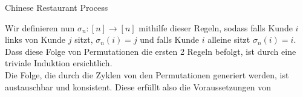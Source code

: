 \begin{section}{Chinese Restaurant Process}
\begin{enumerate}
\end{enumerate}
Wir definieren nun $\sigma_n: [n] \rightarrow [n]$ mithilfe dieser Regeln, sodass falls Kunde $i$ links von Kunde $j$ sitzt, $\sigma_n(i) = j$ und falls Kunde $i$ alleine sitzt $\sigma_n(i) = i$. Dass diese Folge von
Permutationen die ersten 2 Regeln befolgt, ist durch eine triviale Induktion ersichtlich. 
\\
Die Folge, die durch die Zyklen von den Permutationen generiert werden, ist austauschbar und konsistent. Diese erfüllt also die Voraussetzungen von  
\end{section}